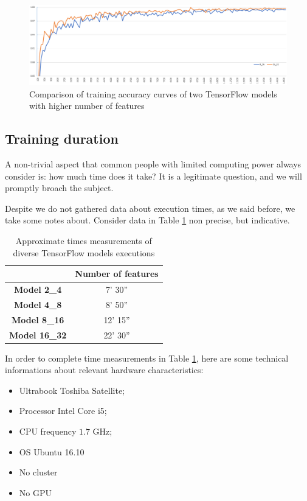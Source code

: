 \begin{landscape}
\begin{figure}
	\centering
	\caption{Comparison of training accuracy curves of two TensorFlow models with higher number of features}
	\label{fig:cfr_high}
	\includegraphics[width=1\textheight]{Images/cfr_8_16_vs_16_32}
\end{figure}
\end{landscape}

\subsection{Training duration}

A non-trivial aspect that common people with limited computing power always consider is: how much time does it take? It is a legitimate question, and we will promptly broach the subject.

Despite we do not gathered data about execution times, as we said before, we take some notes about. Consider data in Table \ref{tab:approx_times} non precise, but indicative.

\begin{table}
	\caption{Approximate times measurements of diverse TensorFlow models executions}
	\label{tab:approx_times}
	\centering
	\begin{tabular}{cc}
		\hline 
		& \textbf{Number of features} \\ 
		\hline 
		\textbf{Model 2\_4} & 7' 30'' \\ 
		\textbf{Model 4\_8} & 8' 50'' \\ 
		\textbf{Model 8\_16} & 12' 15'' \\ 
		\textbf{Model 16\_32} & 22' 30'' \\ 
		\hline 
	\end{tabular}
\end{table}

In order to complete time measurements in Table \ref{tab:approx_times}, here are some technical informations about relevant hardware characteristics:
\begin{itemize}
	\item Ultrabook Toshiba Satellite;
	\item Processor Intel Core i5;
	\item CPU frequency $1.7$ GHz;
	\item OS Ubuntu 16.10
	\item No cluster
	\item No GPU
\end{itemize}

